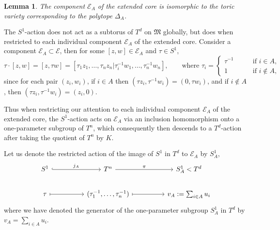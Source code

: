 \documentclass{article}
\newtheorem{lemma}[theorem]{Lemma}
\newcommand{\mcE}{\mathcal{E}}
\newcommand{\mc}[1]{\mathcal{#1}}
\newcommand{\mf}[1]{\mathfrak{#1}}
\begin{document}
	\begin{lemma}
		The component $\mc{E}_{A}$ of the extended core is isomorphic to the toric variety corresponding to the polytope $\Delta_{A}$.
	\end{lemma}
	
	The $S^{1}$-action does not act as a subtorus of $T^{d}$ on $\mf{M}$ globally, but does when restricted to each individual component $\mc{E}_{A}$ of the extended core. Consider a component $\mc{E}_{A} \subset \mc{E}$, then for some $[z,w] \in \mc{E}_{A}$ and $\tau \in S^{1}$,
	\[
	\tau \cdot [z,w] = [z,\tau w] = [\tau_{1} z_{1}, \ldots, \tau_{n} z_{n} | \tau_{i}^{-1}w_{1}, \ldots , \tau_{n}^{-1}w_{n}     ],\qquad \text{where } \tau_{i} = 
	\begin{cases}
		\tau^{-1} \qquad &\text{if } i \in A,\\
		1\qquad &\text{if } i \not\in A,
	\end{cases}	
	\]
	since for each pair $(z_{i}, w_{i})$, if $i \in A$ then $(\tau z_{i}, \tau^{-1}w_{i}) = (0, \tau w_{i})$, and if $i \not\in A$, then $(\tau z_{i}, \tau^{-1}w_{i}) = (z_{i}, 0)$.
	
	Thus when restricting our attention to each individual component $\mc{E}_{A}$ of the extended core, the $S^{1}$-action acts on $\mcE_{A}$ via an inclusion homomorphism onto a one-parameter subgroup of $T^{n}$, which consequently then descends to a $T^{d}$-action after taking the quotient of $T^{n}$ by $K$.
	
	Let us denote the restricted action of the image of $S^{1}$ in $T^{d}$ to $\mcE_{A}$ by $S^{1}_{A}$,
	\[
	\begin{tikzcd}
		S^{1} \arrow[rr, "j_{A}", hook] &  & T^{n} \arrow[rr, "\pi"]                                      &  & S^{1}_{A} < T^{d}    \\
		\tau \arrow[rr, maps to]        &  & {(\tau_{1}^{-1}, \ldots, \tau_{n}^{-1})} \arrow[rr, maps to] &  & v_{A} := \sum_{i \in A} u_{i}
	\end{tikzcd}
	\]
	where we have denoted the generator of the one-parameter subgroup $S_{A}^{1}$ in $T^{d}$ by $v_{A} = \sum_{i \in A} u_{i}$.
	
\end{document}
